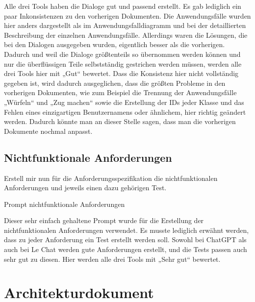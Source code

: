 Alle drei Tools haben die Dialoge gut und passend erstellt. Es gab lediglich ein paar Inkonsistenzen zu den vorherigen Dokumenten. Die 
Anwendungsfälle wurden hier anders dargestellt als im Anwendungsfalldiagramm und bei der detaillierten Beschreibung der einzelnen Anwendungsfälle. 
Allerdings waren die Lösungen, die bei den Dialogen ausgegeben wurden, eigentlich besser als die vorherigen. Dadurch und weil die Dialoge 
größtenteils so übernommen werden können und nur die überflüssigen Teile selbstständig gestrichen werden müssen, werden alle drei Tools hier 
mit „Gut“ bewertet. Dass die Konsistenz hier nicht vollständig gegeben ist, wird dadurch ausgeglichen, dass die größten Probleme in den 
vorherigen Dokumenten, wie zum Beispiel die Trennung der Anwendungsfälle „Würfeln“ und „Zug machen“ sowie die Erstellung der IDs jeder Klasse 
und das Fehlen eines einzigartigen Benutzernamens oder ähnlichem, hier richtig geändert werden. Dadurch könnte man an dieser Stelle sagen, dass 
man die vorherigen Dokumente nochmal anpasst. 

\subsection*{Nichtfunktionale Anforderungen}

\begin{prompt}[H]
    \begin{tcolorbox}[colback=gray!20, colframe=gray!20, boxrule=0pt, sharp corners] 
        Erstell mir nun für die Anforderungsspezifikation die nichtfunktionalen Anforderungen und jeweils einen dazu gehörigen Test.
        \vfill
    \end{tcolorbox}
    \caption{Prompt nichtfunktionale Anforderungen}
    \label{Prompt nichtfunktionale Anforderungen}
\end{prompt}

Dieser sehr einfach gehaltene Prompt wurde für die Erstellung der nichtfunktionalen Anforderungen verwendet. Es musste lediglich erwähnt werden, 
dass zu jeder Anforderung ein Test erstellt werden soll. Sowohl bei ChatGPT als auch bei Le Chat werden gute Anforderungen erstellt, und die 
Tests passen auch sehr gut zu diesen. Hier werden alle drei Tools mit „Sehr gut“ bewertet.

\section{Architekturdokument}  \label{CompArchitekturdokument}

